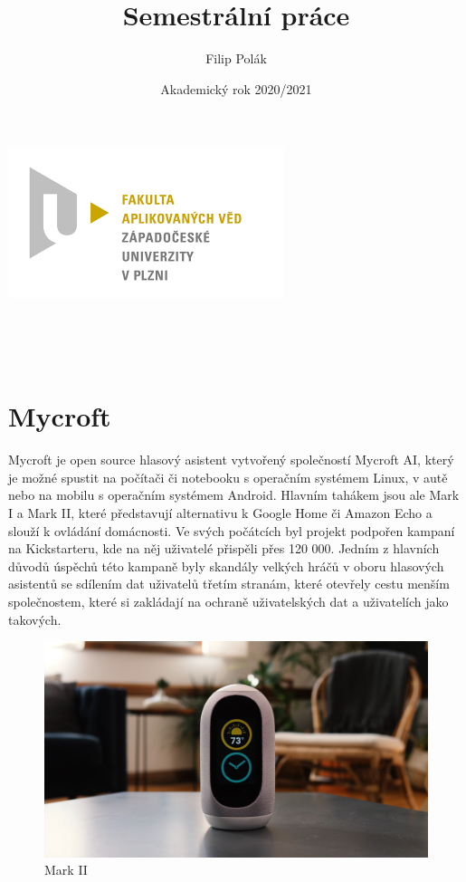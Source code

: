 \documentclass[12pt]{article}
\begin{document}
	
	\title{Semestrální práce}
\author{Filip Polák}
\date{Akademický rok 2020/2021}
\begin{titlepage}
	\begin{center}
		\includegraphics[scale=0.6]{logo_zcu}\\
		\vspace{2cm}
		\begin{large}
			\textbf{\thetitle}\\
		\end{large}
		
		\vspace{3cm}
		\theauthor\\
		\vspace{5cm}
		\thedate
	\end{center}
\end{titlepage}

	\newpage
	\section{Mycroft}
	Mycroft je open source hlasový asistent vytvořený společností Mycroft AI, který je možné spustit na počítači či notebooku s operačním systémem Linux, v autě nebo na mobilu s operačním systémem Android. Hlavním tahákem jsou ale Mark I a Mark II, které představují alternativu k Google Home či Amazon Echo a slouží k ovládání domácnosti. Ve svých počátcích byl projekt podpořen kampaní na Kickstarteru, kde na něj uživatelé přispěli přes 120 000\textdollar. Jedním z hlavních důvodů úspěchů této kampaně byly skandály velkých hráčů v oboru hlasových asistentů se sdílením dat uživatelů třetím stranám, které otevřely cestu menším společnostem, které si zakládají na ochraně uživatelských dat a uživatelích jako takových.

	\begin{figure}[H] 
		\begin{center}
			\includegraphics[scale=.20]{figures/mark_II}
			\caption{Mark II}\label{fig:mark_II}
		\end{center}
	\end{figure}
\end{document}
